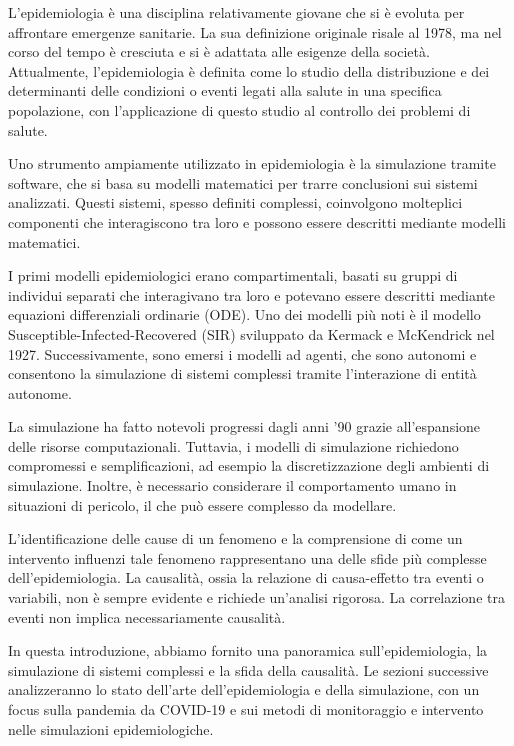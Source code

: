 L'epidemiologia è una disciplina relativamente giovane che si è evoluta 
per affrontare emergenze sanitarie. La sua definizione originale risale 
al 1978, ma nel corso del tempo è cresciuta e si è adattata alle esigenze 
della società. Attualmente, l'epidemiologia è definita come lo studio 
della distribuzione e dei determinanti delle condizioni o eventi legati 
alla salute in una specifica popolazione, con l'applicazione di questo 
studio al controllo dei problemi di salute.

Uno strumento ampiamente utilizzato in epidemiologia è la simulazione 
tramite software, che si basa su modelli matematici per trarre conclusioni 
sui sistemi analizzati. Questi sistemi, spesso definiti complessi, 
coinvolgono molteplici componenti che interagiscono tra loro e possono 
essere descritti mediante modelli matematici.

I primi modelli epidemiologici erano compartimentali, basati su gruppi di 
individui separati che interagivano tra loro e potevano essere descritti 
mediante equazioni differenziali ordinarie (ODE). Uno dei modelli più noti 
è il modello Susceptible-Infected-Recovered (SIR) sviluppato da 
Kermack e McKendrick nel 1927. Successivamente, sono emersi i modelli ad 
agenti, che sono autonomi e consentono la simulazione di sistemi complessi 
tramite l'interazione di entità autonome.

La simulazione ha fatto notevoli progressi dagli anni '90 grazie 
all'espansione delle risorse computazionali. Tuttavia, i modelli di 
simulazione richiedono compromessi e semplificazioni, ad esempio la 
discretizzazione degli ambienti di simulazione. Inoltre, è necessario 
considerare il comportamento umano in situazioni di pericolo, il che può 
essere complesso da modellare.

L'identificazione delle cause di un fenomeno e la comprensione di come un 
intervento influenzi tale fenomeno rappresentano una delle sfide più 
complesse dell'epidemiologia. La causalità, ossia la relazione di 
causa-effetto tra eventi o variabili, non è sempre evidente e richiede 
un'analisi rigorosa. La correlazione tra eventi non implica 
necessariamente causalità.

In questa introduzione, abbiamo fornito una panoramica sull'epidemiologia, 
la simulazione di sistemi complessi e la sfida della causalità. 
Le sezioni successive analizzeranno lo stato dell'arte dell'epidemiologia 
e della simulazione, con un focus sulla pandemia da COVID-19 e sui metodi 
di monitoraggio e intervento nelle simulazioni epidemiologiche.